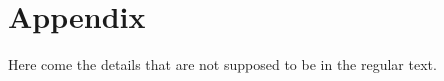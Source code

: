 \chapter*{Appendix}
\label{chapter:Appendix}
Here come the details that are not supposed to be in the regular text.